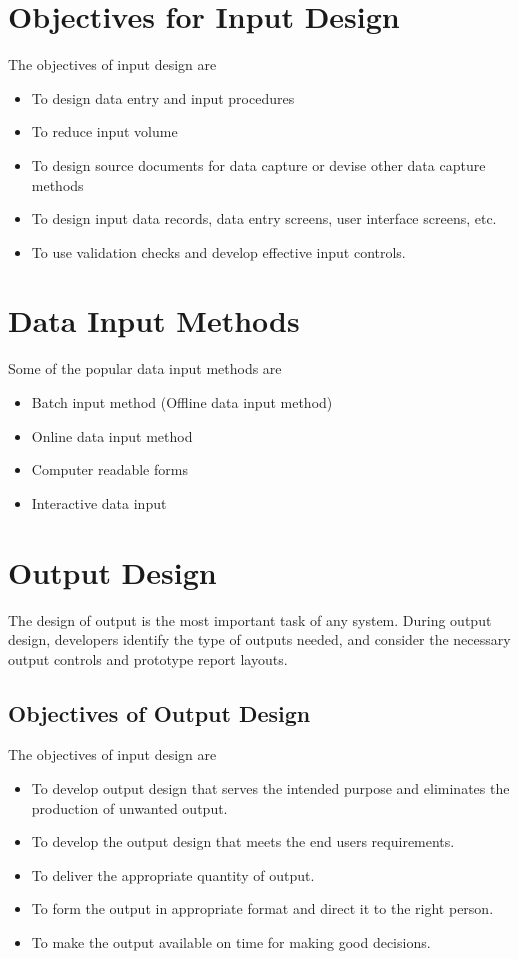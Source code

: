 \documentclass[a4paper,12pt]{report}
\begin{document}
\section{Objectives for Input Design}
The objectives of input design are 
\begin{itemize}
	\item 	To design data entry and input procedures
	\item 	To reduce input volume
	\item	To design source documents for data capture or devise other data capture methods
	\item 	To design input data records, data entry screens, user interface screens, etc.
	\item 	To use validation checks and develop effective input controls.
\end{itemize}

\section{Data Input Methods}
Some of the popular data input methods are 
\begin{itemize}
	\item 	Batch input method (Offline data input method)
	\item 	Online data input method
	\item 	Computer readable forms
	\item 	Interactive data input
\end{itemize}


\section{Output Design}
The design of output is the most important task of any system. During output design, developers identify the type of outputs needed, and consider the necessary output controls and prototype report layouts.

\subsection{Objectives of Output Design}
The objectives of input design are 
\begin{itemize}
	\item 	To develop output design that serves the intended purpose and eliminates the production of unwanted output.
	\item 	To develop the output design that meets the end users requirements.
	\item 	To deliver the appropriate quantity of output.
	\item 	To form the output in appropriate format and direct it to the right person.
	\item 	To make the output available on time for making good decisions.
\end{itemize}	
\end{document}
